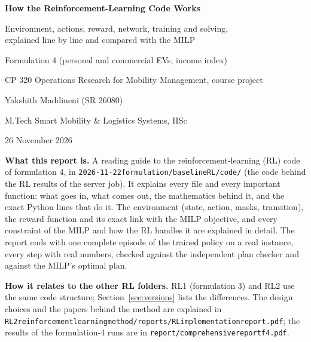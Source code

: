 \documentclass[11pt,a4paper]{article}
\newcommand{\code}[1]{\texttt{#1}}
\renewcommand{\_}{\origunderscore\allowbreak}
\theoremstyle{plain}
\begin{document}
\begin{titlepage}
\centering
\vspace*{2cm}
{\LARGE\bfseries\color{headblue} How the Reinforcement-Learning Code Works\par}
\vspace{6pt}
{\Large Environment, actions, reward, network, training and solving,\\ explained line by line and compared with the MILP\par}
\vspace{14pt}
{\large Formulation 4 (personal and commercial EVs, income index)\par}
\vspace{4pt}
{\large CP 320 Operations Research for Mobility Management, course project\par}
\vspace{22pt}
{\large Yakshith Maddineni (SR 26080)\par}
{\normalsize M.Tech Smart Mobility \& Logistics Systems, IISc\par}
\vspace{6pt}
{\normalsize 26 November 2026\par}
\vfill
\begin{keybox}
\textbf{What this report is.} A reading guide to the reinforcement-learning (RL) code of formulation 4, in \code{2026-11-22\_formulation\_4/baseline\_RL/code/} (the code behind the RL results of the server job). It explains every file and every important function: what goes in, what comes out, the mathematics behind it, and the exact Python lines that do it. The environment (state, action, masks, transition), the reward function and its exact link with the MILP objective, and every constraint of the MILP and how the RL handles it are explained in detail. The report ends with one complete episode of the trained policy on a real instance, every step with real numbers, checked against the independent plan checker and against the MILP's optimal plan.

\textbf{How it relates to the other RL folders.} RL1 (formulation 3) and RL2 use the same code structure; Section~\ref{sec:versions} lists the differences. The design choices and the papers behind the method are explained in \code{RL2\_reinforcement\_learning\_method\_2/reports/RL\_implementation\_report.pdf}; the results of the formulation-4 runs are in \code{report/comprehensive\_report\_f4.pdf}.
\end{keybox}
\end{titlepage}

\tableofcontents
\newpage












\end{document}
